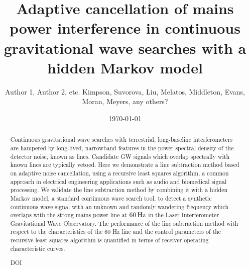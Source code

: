\documentclass[pra,superscriptaddress,reprint,amsmath,amssymb,nofootinbib]{revtex4-2}
\begin{document}
\preprint{}

\title[test short title]{Adaptive cancellation of mains power interference in continuous gravitational wave searches with a hidden Markov model}%

%

\author{Author 1, Author 2, etc. Kimpson, Suvorova, Liu, Melatos, Middleton, Evans, Moran, Meyers, any others?}
\date{\today}%


\begin{abstract}
		Continuous gravitational wave searches with terrestrial, long-baseline interferometers are hampered by long-lived, narrowband features in the power spectral density of the detector noise, known as lines. Candidate GW signals which overlap spectrally with known lines are typically vetoed. Here we demonstrate a line subtraction method based on adaptive noise cancellation, using a recursive least squares algorithm, a common approach in electrical engineering applications such as audio and biomedical signal processing. We validate the line subtraction method by combining it with a hidden Markov model, a standard continuous wave search tool, to detect a synthetic continuous wave signal with an unknown and randomly wandering frequency which overlaps with the strong mains power line at $60 \, {\rm Hz}$ in the Laser Interferometer Gravitational Wave Observatory. The performance of the line subtraction method with respect to the characteristics of the 60 Hz line and the control parameters of the recursive least squares algorithm is quantified in terms of receiver operating characteristic curves.
		
\begin{description}
\item[DOI]
\end{description}
\end{abstract}



\maketitle	
\end{document}
